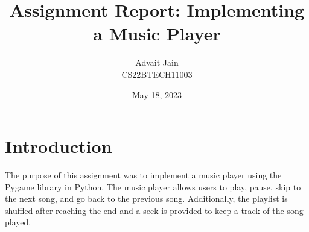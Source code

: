 \documentclass[journal,12pt,twocolumn]{IEEEtran}
\begin{document}
\title{Assignment Report: Implementing a Music Player}
\author{Advait Jain \\ CS22BTECH11003}
\date{May 18, 2023}

\maketitle

\section{Introduction}
The purpose of this assignment was to implement a music player using the Pygame library in Python. The music player allows users to play, pause, skip to the next song, and go back to the previous song. Additionally, the playlist is shuffled after reaching the end and a seek is provided to keep a track of the song played.
\end{document}
